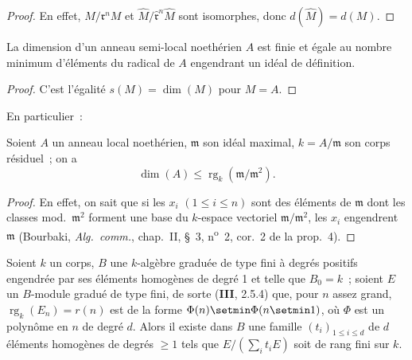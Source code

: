 
\begin{proof}
En effet, $M/\mathfrak{r}^nM$ et
$\widehat{M}/\widehat{\mathfrak{r}}^n\widehat{M}$ sont isomorphes, donc
$d(\widehat{M})=d(M)$.
\end{proof}

\begin{corollary}[16.2.5]
\label{0.16.2.5-fr}
La dimension d'un anneau semi-local noethérien $A$ est finie et égale au
nombre minimum d'éléments du radical de $A$ engendrant un idéal de définition.
\end{corollary}

\begin{proof}
C'est l'égalité $s(M)=\dim(M)$ pour $M=A$.
\end{proof}

En particulier~:

\begin{corollary}[16.2.6]
\label{0.16.2.6-fr}
Soient $A$ un anneau local noethérien, $\mathfrak{m}$ son idéal maximal,
$k=A/\mathfrak{m}$ son corps résiduel~; on a
\begin{equation}
\label{0.16.2.6.1-fr}
\tag{16.2.6.1}
  \dim(A)\leq\operatorname{rg}_k(\mathfrak{m}/\mathfrak{m}^2).
\end{equation}
\end{corollary}

\begin{proof}
En effet, on sait que si les $x_i$ $(1\leq i\leq n)$ sont des éléments de
$\mathfrak{m}$ dont les classes mod.~$\mathfrak{m}^2$ forment une base du
$k$-espace vectoriel $\mathfrak{m}/\mathfrak{m}^2$, les $x_i$ engendrent
$\mathfrak{m}$ (Bourbaki, \emph{Alg.~comm.}, chap.~II, \S~3, n\textsuperscript{o}~2, cor.~2 de
la prop.~4).
\end{proof}

\begin{proposition}[16.2.7]
\label{0.16.2.7-fr}
Soient $k$ un corps, $B$ une $k$-algèbre graduée de type fini à degrés
positifs engendrée par ses éléments homogènes de degré 1 et telle que $B_0=k$~;
soient $E$ un $B$-module gradué de type fini, de sorte \textup{(\textbf{III}, 2.5.4)} que, pour $n$
assez grand, $\operatorname{rg}_k(E_n)=r(n)$ est de la forme
$\Phi(n)\setmin\Phi(n\setmin 1)$, où $\Phi$ est un polynôme en $n$ de degré $d$. Alors il
existe dans $B$ une famille $(t_i)_{1\leq i\leq d}$ de $d$ éléments homogènes
de degrés $\geq1$ tels que $E/(\sum_i t_iE)$ soit de rang fini sur $k$.
\end{proposition}

